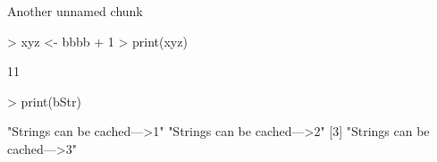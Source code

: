 \documentclass[11pt]{article}
\begin{document}
Another unnamed chunk

\begin{Schunk}
\begin{Sinput}
> xyz <- bbbb + 1
> print(xyz)
\end{Sinput}
\begin{Soutput}
[1] 11
\end{Soutput}
\begin{Sinput}
> print(bStr)
\end{Sinput}
\begin{Soutput}
[1] "Strings can be cached--->1" "Strings can be cached--->2"
[3] "Strings can be cached--->3"
\end{Soutput}
\end{Schunk}
\end{document}
